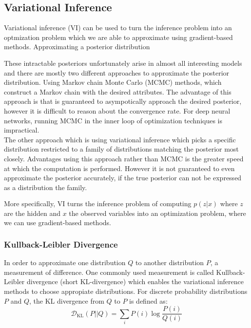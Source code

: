 \subsection{Variational Inference}
Variational inference (VI) can be used to turn the inference problem into an optmization problem which we are able to approximate using gradient-based methods.
Approximating a posterior distribution 

These intractable posteriors unfortunately arise in almost all interesting models and there are mostly two different approaches to approximate the posterior distribution.
Using Markov chain Monte Carlo (MCMC) methods, which construct a Markov chain with the desired attributes. The advantage of this approach is that is guaranteed to asympotically approach the desired posterior, however it is difficult to reason about the convergence rate. For deep neural networks, running MCMC in the inner loop of optimization techniques is impractical.\\
The other approach which is using variational inference which picks a specific distribution restricted to a family of distributions matching the posterior most closely.
Advantages using this approach rather than MCMC is the greater speed at which the computation is performed.
However it is not guaranteed to even approximate the posterior accurately, if the true posterior can not be expressed as a distribution the family.

More specifically, VI turns the inference problem of computing $p(z|x)$ where $z$ are the hidden and $x$ the observed variables into an optimization problem, where we can use gradient-based methods.


\subsubsection{Kullback-Leibler Divergence}
In order to approximate one distribution $Q$ to another distribution $P$, a measurement of difference.
One commonly used measurement is called Kullback-Leibler divergence (short KL-divergence) which enables the variational inference methods to choose appropiate distributions.
For discrete probability distributions $P$ and $Q$, the KL divergence from $Q$ to $P$ is defined\cite{kl_div:1951} as:
\begin{equation}
  \mathcal{D}_{\mathrm{KL}}(P || Q) = \sum_{i} P(i) \log \frac{P(i)}{Q(i)}
\end{equation}

